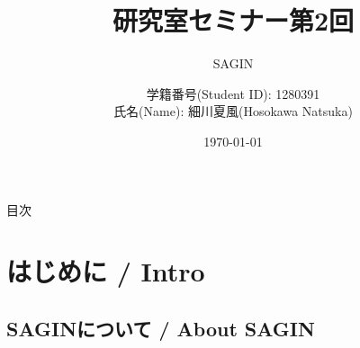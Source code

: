 \documentclass[11pt, aspectratio=169]{beamer}
\title{研究室セミナー第2回}
\subtitle{SAGIN}
\author{学籍番号(Student ID): 1280391 \\ 氏名(Name): 細川夏風(Hosokawa Natsuka)}
\institute{高知工科大学(Kochi Univ of Tech)}
\date{\today}
\begin{document}
\begin{frame}
    \titlepage
\end{frame}

\begin{frame}{目次}
    \tableofcontents
\end{frame}


\section{はじめに / Intro}

\subsection{SAGINについて / About SAGIN}
\end{document}
